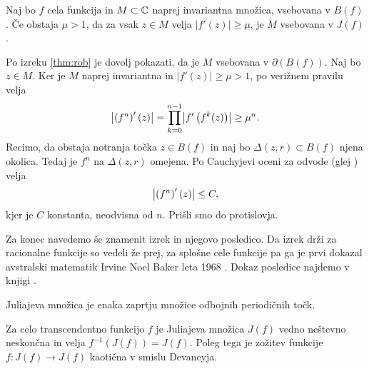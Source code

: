 \begin{izrek} \label{thm:julm}
    Naj bo \(f\) cela funkcija in \(M \subset \mathbb C\) naprej invariantna množica, vsebovana v \(B (f)\). Če obstaja \(\mu > 1\), da za vsak \(z \in M\) velja \(|f' (z)| \geq \mu\), je \(M\) vsebovana v \(J (f)\).
\end{izrek}

\begin{dokaz}
    Po izreku \ref{thm:rob} je dovolj pokazati, da je \(M\) vsebovana v \(\partial (B (f))\). Naj bo \(z \in M\). Ker je \(M\) naprej invariantna in \(|f' (z)| \geq \mu > 1\), po verižnem pravilu velja
    \[\abs{\prt{f^n}' (z)} = \prod_{k = 0}^{n - 1} \abs{f' \prt{ f^k (z)}} \geq \mu^n.\]
    Recimo, da obstaja notranja točka \(z \in B (f)\) in naj bo \(\Delta (z, r) \subset B (f)\) njena okolica. Tedaj je \(f^n\) na \(\Delta (z, r)\) omejena. Po Cauchyjevi oceni za odvode (glej \cite[izrek 62]{Globevnik_2010}) velja
    \[\left\lvert\left( f^n \right)' (z)\right\rvert \leq C,\]
    kjer je \(C\) konstanta, neodvisna od \(n\). Prišli smo do protislovja.
\end{dokaz}

Za konec navedemo še znamenit izrek in njegovo posledico. Da izrek drži za racionalne funkcije so vedeli že prej, za splošne cele funkcije pa ga je prvi dokazal avstralski matematik Irvine Noel Baker leta \num{1968} \cite{Baker_1968}. Dokaz posledice najdemo v knjigi \cite[izreka 6.2.4 in 6.3.12]{Pineiro_2025}.

\begin{izrek} \label{thm:closure}
    Juliajeva množica je enaka zaprtju množice odbojnih periodičnih točk.
\end{izrek}

\begin{posledica}
    Za celo transcendentno funkcijo \(f\) je Juliajeva množica \(J (f)\) vedno neštevno neskončna in velja \(f^{-1} (J (f)) = J (f)\). Poleg tega je zožitev funkcije \(f \colon J (f) \to J (f)\) kaotična v smislu Devaneyja.
\end{posledica}
